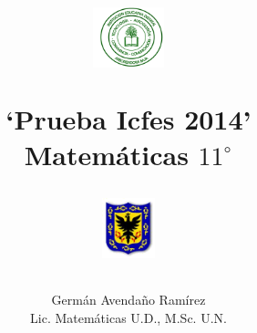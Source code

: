 \documentclass[10pt,addpoints]{exam}
\begin{document}
\title{\begin{minipage}{.2\textwidth}
        \includegraphics[height=1.75cm]{Images/logo-colegio.png}
       \end{minipage}
\begin{minipage}{.55\textwidth}
 \begin{center}
`Prueba Icfes 2014'\\Matemáticas $11^{\circ}$
\end{center}
\end{minipage}
\begin{minipage}{.2\textwidth}
\includegraphics[height=1.75cm]{Images/logo-sed.png} 
\end{minipage}
}
\author{Germ\'{a}n Avendaño Ram\'{i}rez\\Lic. Matemáticas U.D., M.Sc. U.N.}
\date{}
\maketitle
\begin{center}
\end{center}
\vspace{0.1in}
\end{document}
